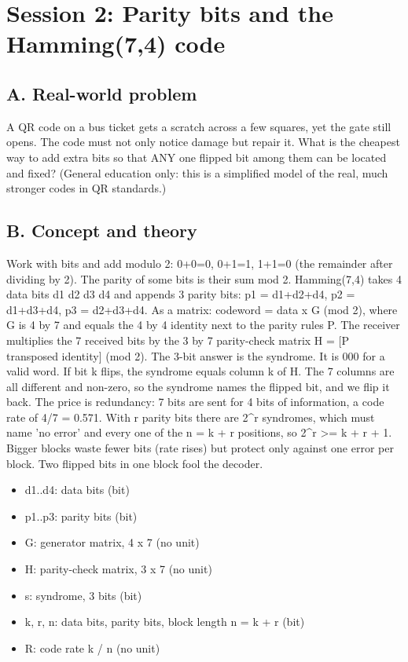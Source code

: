 \documentclass[11pt,a4paper]{article}
\begin{document}
\section{Session 2: Parity bits and the Hamming(7,4) code}

\subsection*{A. Real-world problem}
A QR code on a bus ticket gets a scratch across a few squares, yet the gate still opens. The code must not only notice damage but repair it. What is the cheapest way to add extra bits so that ANY one flipped bit among them can be located and fixed? (General education only: this is a simplified model of the real, much stronger codes in QR standards.)

\subsection*{B. Concept and theory}
Work with bits and add modulo 2: 0+0=0, 0+1=1, 1+1=0 (the remainder after dividing by 2). The parity of some bits is their sum mod 2. Hamming(7,4) takes 4 data bits d1 d2 d3 d4 and appends 3 parity bits: p1 = d1+d2+d4, p2 = d1+d3+d4, p3 = d2+d3+d4. As a matrix: codeword = data x G (mod 2), where G is 4 by 7 and equals the 4 by 4 identity next to the parity rules P. The receiver multiplies the 7 received bits by the 3 by 7 parity-check matrix H = [P transposed \textbar{} identity] (mod 2). The 3-bit answer is the syndrome. It is 000 for a valid word. If bit k flips, the syndrome equals column k of H. The 7 columns are all different and non-zero, so the syndrome names the flipped bit, and we flip it back. The price is redundancy: 7 bits are sent for 4 bits of information, a code rate of 4/7 = 0.571. With r parity bits there are 2\textasciicircum{}r syndromes, which must name 'no error' and every one of the n = k + r positions, so 2\textasciicircum{}r \textgreater{}= k + r + 1. Bigger blocks waste fewer bits (rate rises) but protect only against one error per block. Two flipped bits in one block fool the decoder.

\begin{itemize}[nosep]
\item d1..d4: data bits (bit)
\item p1..p3: parity bits (bit)
\item G: generator matrix, 4 x 7 (no unit)
\item H: parity-check matrix, 3 x 7 (no unit)
\item s: syndrome, 3 bits (bit)
\item k, r, n: data bits, parity bits, block length n = k + r (bit)
\item R: code rate k / n (no unit)
\end{itemize}
\end{document}
